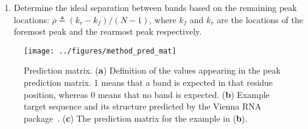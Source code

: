 \begin{enumerate}
\item Determine the ideal separation between bands based on the remaining peak locations: $\rho \triangleq (k_r - k_f) / (N-1)$, where $k_f$ and $k_r$ are the locations of the foremost peak and the rearmost peak respectively.%
\end{enumerate}




\begin{figure}
\centering
\texttt{[image: ../figures/method\_pred\_mat]}
\caption{Prediction matrix. (\textbf{a}) Definition of the values appearing in the peak prediction matrix. 1 means that a band is expected in that residue position, whereas 0 means that no band is expected. (\textbf{b}) Example target sequence and its structure predicted by the Vienna RNA package~\citep{hofacker2003vienna}. (\textbf{c}) The prediction matrix for the example in (\textbf{b}).}
\label{f:pred-mat}
\end{figure}


